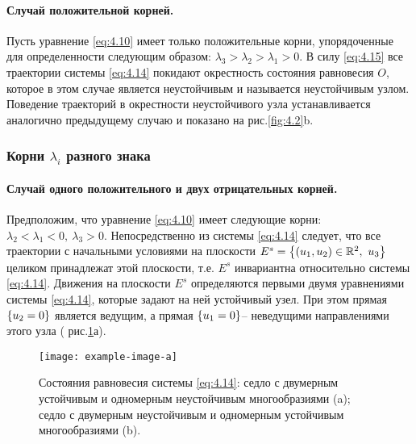 \paragraph{Случай положительной корней.}%
\label{par:sluchai_polozhitel_noi_kornei_}

Пусть уравнение \eqref{eq:4.10} имеет только положительные корни, упорядоченные для определенности следующим образом: $\lambda_3 > \lambda_2>\lambda_1>0$. В силу \eqref{eq:4.15} все траектории системы \eqref{eq:4.14} покидают окрестность состояния равновесия $O$, которое в этом случае является неустойчивым и называется неустойчивым узлом. Поведение траекторий в окрестности неустойчивого узла устанавливается аналогично предыдущему случаю и показано на рис.\ref{fig:4.2}b.

\subsubsection{Корни $\lambda_i$ разного знака}%
\label{ssub:korni_lambda_i_raznogo_znaka}
\paragraph{Случай одного положительного и двух отрицательных корней.}%
\label{par:sluchai_odnogo_polozhitel_nogo_i_dvukh_otritsatel_nykh_kornei_}

Предположим, что уравнение \eqref{eq:4.10} имеет следующие корни: $\lambda_2<\lambda_1<0, ~ \lambda_3>0$. Непосредственно из системы \eqref{eq:4.14} следует, что все траектории с начальными условиями на плоскости $E^{s} = \qty{ (u_1,u_2) \in \mathbb{R}^2, ~ u_3 }$ целиком принадлежат этой плоскости, т.е. $E^s$ инвариантна относительно системы \eqref{eq:4.14}. Движения на плоскости $E^s$ определяются первыми двумя уравнениями системы \eqref{eq:4.14}, которые задают на ней устойчивый узел. При этом прямая 
$\qty{u_2=0}$ является ведущим, а прямая $\qty{u_1 = 0}$-- неведущими направлениями этого узла ( рис.\ref{fig:4.3}а). 

\begin{figure}[h!]
        \centering
        \texttt{[image: example-image-a]}
        \caption{Состояния равновесия системы \eqref{eq:4.14}: седло с двумерным устойчивым и одномерным неустойчивым многообразиями (a); седло с двумерным неустойчивым и одномерным устойчивым многообразиями (b).}
        \label{fig:4.3}
\end{figure}

